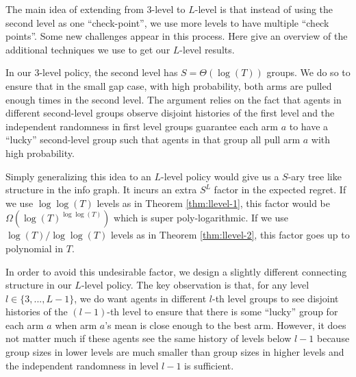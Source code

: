 The main idea of extending from 3-level to $L$-level is that instead of using the second level as one ``check-point'', we use more levels to have multiple ``check points''.  Some new challenges appear in this process. Here give an overview of the additional techniques we use to get our $L$-level results. 

 In our 3-level policy, the second level has $S = \Theta(\log(T))$ groups. We do so to ensure that in the small gap case, with high probability, both arms are pulled enough times in the second level. The argument relies on the fact that agents in different second-level groups observe disjoint histories of the first level and the independent randomness in first level groups guarantee each arm $a$ to have a ``lucky'' second-level group such that agents in that group all pull arm $a$ with high probability. 

Simply generalizing this idea to an $L$-level policy would give us a $S$-ary tree like structure in the info graph. It incurs an extra $S^L$ factor in the expected regret. If we use $\log\log(T)$ levels as in Theorem \ref{thm:llevel-1}, this factor would be $\Omega\left(\log(T)^{\log\log(T)}\right)$ which is super poly-logarithmic. If we use $\log(T)/\log\log(T)$ levels as in Theorem \ref{thm:llevel-2}, this factor goes up to polynomial in $T$. 

In order to avoid this undesirable factor, we design a slightly different connecting structure in our $L$-level policy. The key observation is that, for any level $l \in \{3,...,L-1\}$, we do want agents in different $l$-th level groups to see disjoint histories of the $(l-1)$-th level to ensure that there is some ``lucky'' group for each arm $a$ when arm $a$'s mean is close enough to the best arm. However, it does not matter much if these agents see the same history of levels below $l-1$ because group sizes in lower levels are much smaller than group sizes in higher levels and the independent randomness in level $l-1$ is sufficient.


